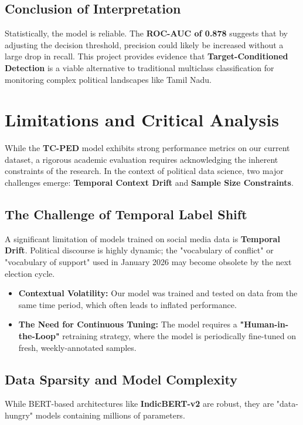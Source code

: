 \documentclass[12pt,a4paper]{article}
\begin{document}
\subsection{Conclusion of Interpretation}
Statistically, the model is reliable. The \textbf{ROC-AUC of 0.878} suggests that by adjusting the decision threshold, precision could likely be increased without a large drop in recall. This project provides evidence that \textbf{Target-Conditioned Detection} is a viable alternative to traditional multiclass classification for monitoring complex political landscapes like Tamil Nadu.

\section{Limitations and Critical Analysis}
While the \textbf{TC-PED} model exhibits strong performance metrics on our current dataset, a rigorous academic evaluation requires acknowledging the inherent constraints of the research. In the context of political data science, two major challenges emerge: \textbf{Temporal Context Drift} and \textbf{Sample Size Constraints}.

\subsection{The Challenge of Temporal Label Shift}
A significant limitation of models trained on social media data is \textbf{Temporal Drift}. Political discourse is highly dynamic; the "vocabulary of conflict" or "vocabulary of support" used in January 2026 may become obsolete by the next election cycle.

\begin{itemize}
    \item \textbf{Contextual Volatility:} Our model was trained and tested on data from the same time period, which often leads to inflated performance. 
    \item \textbf{The Need for Continuous Tuning:} The model requires a \textbf{"Human-in-the-Loop"} retraining strategy, where the model is periodically fine-tuned on fresh, weekly-annotated samples.
\end{itemize}



\subsection{Data Sparsity and Model Complexity}
While BERT-based architectures like \textbf{IndicBERT-v2} are robust, they are "data-hungry" models containing millions of parameters. 
\end{document}
